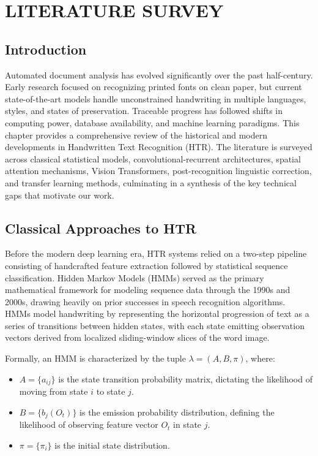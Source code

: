 
\chapter{LITERATURE SURVEY}
\label{ch:literaturesurvey}

\section{Introduction}
Automated document analysis has evolved significantly over the past half-century. Early research focused on recognizing printed fonts on clean paper, but current state-of-the-art models handle unconstrained handwriting in multiple languages, styles, and states of preservation. Traceable progress has followed shifts in computing power, database availability, and machine learning paradigms. This chapter provides a comprehensive review of the historical and modern developments in Handwritten Text Recognition (HTR). The literature is surveyed across classical statistical models, convolutional-recurrent architectures, spatial attention mechanisms, Vision Transformers, post-recognition linguistic correction, and transfer learning methods, culminating in a synthesis of the key technical gaps that motivate our work.

\section{Classical Approaches to HTR}
Before the modern deep learning era, HTR systems relied on a two-step pipeline consisting of handcrafted feature extraction followed by statistical sequence classification. Hidden Markov Models (HMMs) served as the primary mathematical framework for modeling sequence data through the 1990s and 2000s, drawing heavily on prior successes in speech recognition algorithms. HMMs model handwriting by representing the horizontal progression of text as a series of transitions between hidden states, with each state emitting observation vectors derived from localized sliding-window slices of the word image.

Formally, an HMM is characterized by the tuple $\lambda = (A, B, \pi)$, where:
\begin{itemize}
    \item $A = \{a_{ij}\}$ is the state transition probability matrix, dictating the likelihood of moving from state $i$ to state $j$.
    \item $B = \{b_j(O_t)\}$ is the emission probability distribution, defining the likelihood of observing feature vector $O_t$ in state $j$.
    \item $\pi = \{\pi_i\}$ is the initial state distribution.
\end{itemize}

